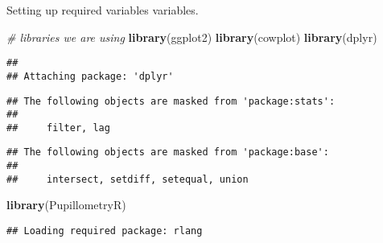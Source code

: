 \documentclass[]{book}
\newenvironment{Shaded}{\begin{snugshade}}{\end{snugshade}}
\newcommand{\CommentTok}[1]{\textcolor[rgb]{0.56,0.35,0.01}{\textit{#1}}}
\newcommand{\KeywordTok}[1]{\textcolor[rgb]{0.13,0.29,0.53}{\textbf{#1}}}
\newcommand{\NormalTok}[1]{#1}
\begin{document}
Setting up required variables variables.

\begin{Shaded}
\begin{Highlighting}[]
\CommentTok{# libraries we are using}
\KeywordTok{library}\NormalTok{(ggplot2)}
\KeywordTok{library}\NormalTok{(cowplot)}
\KeywordTok{library}\NormalTok{(dplyr)}
\end{Highlighting}
\end{Shaded}

\begin{verbatim}
## 
## Attaching package: 'dplyr'
\end{verbatim}

\begin{verbatim}
## The following objects are masked from 'package:stats':
## 
##     filter, lag
\end{verbatim}

\begin{verbatim}
## The following objects are masked from 'package:base':
## 
##     intersect, setdiff, setequal, union
\end{verbatim}

\begin{Shaded}
\begin{Highlighting}[]
\KeywordTok{library}\NormalTok{(PupillometryR)}
\end{Highlighting}
\end{Shaded}

\begin{verbatim}
## Loading required package: rlang
\end{verbatim}
\end{document}
